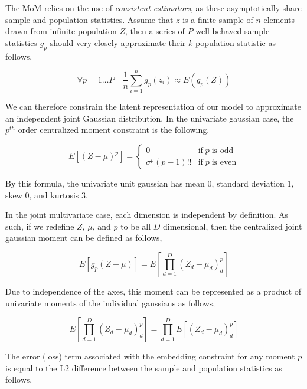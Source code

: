 \documentclass[10pt,twocolumn,letterpaper]{article}
\begin{document}
The MoM relies on the use of \textit{consistent estimators}, as these asymptotically share sample and population statistics.
Assume that $z$ is a finite sample of $n$ elements drawn from infinite population $Z$, then a series of $P$ well-behaved sample statistics $g_p$ should very closely approximate their $k$ population statistic as follows,

\begin{equation}
	\forall p=1 \dots P \quad
	\frac{1}{n} \sum_{i=1}^n g_p(z_i) \approx E(g_p(Z))
\end{equation}

We can therefore constrain the latent representation of our model to approximate an independent joint Gaussian distribution. 
In the univariate gaussian case, the $p^{th}$ order centralized moment constraint is the following.

\begin{equation}
	E\left[ (Z-\mu)^p \right] = 
	\begin{cases} 
		0 &  \text{if} \; p \; \text{is odd} \\
		\sigma^p(p - 1)!! & \text{if} \; p \; \text{is even}
	\end{cases}
\end{equation}

By this formula, the univariate unit gaussian has mean $0$, standard deviation $1$, skew $0$, and kurtosis 3.

In the joint multivariate case, each dimension is independent by definition.  As such, if we redefine $Z$, $\mu$, and $p$ to be all $D$ dimensional, then the centralized joint gaussian moment can be defined as follows,

\begin{equation}
	E\left[g_p(Z - \mu)\right] = E\left[ \prod_{d=1}^D (Z_d - \mu_d)^p_d \right]
\end{equation}

Due to independence of the axes, this moment can be represented as a product of univariate moments of the individual gaussians as follows,

\begin{equation}
	E\left[ \prod_{d=1}^D (Z_d - \mu_d)^p_d \right] = \prod_{d=1}^D E\left[ (Z_d - \mu_d)^p_d \right]
\end{equation}

The error (loss) term associated with the embedding constraint for any moment $p$ is equal to the L2 difference between the sample and population statistics as follows,
\end{document}
